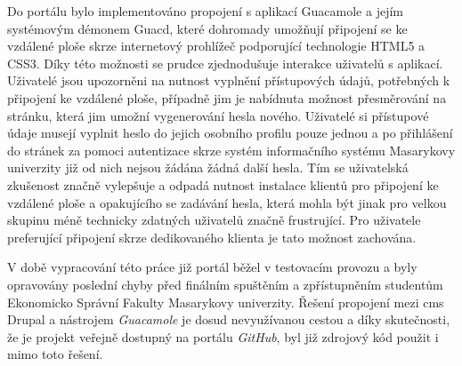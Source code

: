 Do portálu bylo implementováno propojení s aplikací Guacamole a jejím systémovým démonem Guacd, které dohromady umožňují připojení se ke vzdálené ploše skrze internetový prohlížeč podporující technologie HTML5 a CSS3. Díky této možnosti se prudce zjednodušuje interakce uživatelů s aplikací. Uživatelé jsou upozorněni na nutnost vyplnění přístupových údajů, potřebných k připojení ke vzdálené ploše, případně jim je nabídnuta možnost přesměrování na stránku, která jim umožní vygenerování hesla nového. Uživatelé si přístupové údaje musejí vyplnit heslo do jejich osobního profilu pouze jednou a po přihlášení do stránek za pomoci autentizace skrze systém informačního systému Masarykovy univerzity již od nich nejsou žádána žádná další hesla. Tím se uživatelská zkušenost značně vylepšuje a odpadá nutnost instalace klientů pro připojení ke vzdálené ploše a opakujícího se zadávání hesla, která mohla být jinak pro velkou skupinu méně technicky zdatných uživatelů značně frustrující. Pro uživatele preferující připojení skrze dedikovaného klienta je tato možnost zachována.

V době vypracování této práce již portál běžel v testovacím provozu a byly opravovány poslední chyby před finálním spuštěním a zpřístupněním studentům Ekonomicko Správní Fakulty Masarykovy univerzity. Řešení propojení mezi \gls{cms} Drupal a nástrojem \emph{Guacamole} je dosud nevyužívanou cestou a díky skutečnosti, že je projekt veřejně dostupný na portálu \emph{GitHub}, byl již zdrojový kód použit i mimo toto řešení.
